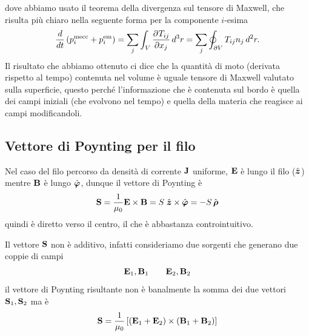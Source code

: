 dove abbiamo usato il teorema della divergenza sul tensore di Maxwell, che risulta più chiaro nella seguente forma per la componente $ i $-esima
\begin{align}
  \frac{d}{dt} \left( p_i^{\text{mecc}} + p_i^{\text{em}} \right) 
  = \sum_{j} \int_V \frac{\partial^{} {T_{i j}}}{\partial {x_j}^{}} \,d^3r = \sum_{j} \oint_{\partial V} T_{i j} n_j \,d^2r.
\end{align}
Il risultato che abbiamo ottenuto ci dice che la quantità di moto (derivata rispetto al tempo) contenuta nel volume è uguale tensore di Maxwell 
valutato sulla superficie, questo perché l'informazione che è contenuta sul bordo è quella dei campi iniziali (che evolvono nel tempo) e quella della 
materia che reagisce ai campi modificandoli.

\subsection{Vettore di Poynting per il filo}
Nel caso del filo percorso da densità di corrente $ \mathbf{ J } $ uniforme, $ \mathbf{ E } $ è lungo il filo ($ \hat{\boldsymbol{z}} $) mentre $ \mathbf{ B } $ è 
lungo $ \hat{\boldsymbol{\varphi}} $, dunque il vettore di Poynting è 
\begin{align}
  \mathbf{ S } = \frac{1}{\mu_0} \mathbf{ E } \times \mathbf{ B } = S\; \hat{\boldsymbol{z}} \times \hat{\boldsymbol{\varphi}} = - S \, \hat{\boldsymbol{\rho}}
\end{align}
quindi è diretto verso il centro, il che è abbastanza controintuitivo.

Il vettore $ \mathbf{ S } $ non è additivo, infatti consideriamo due sorgenti che generano due coppie di campi
\begin{align}
  \mathbf{ E }_1 , \mathbf{ B }_1 \qquad \mathbf{ E }_2 , \mathbf{ B }_2
\end{align}
il vettore di Poynting risultante non è banalmente la somma dei due vettori $ \mathbf{ S }_1, \mathbf{ S }_2 $ ma è
\begin{align}
  \mathbf{ S } = \frac{1}{\mu_0} \left[ (\mathbf{ E }_1 + \mathbf{ E }_2) \times (\mathbf{ B }_1 + \mathbf{ B }_2 ) \right]
\end{align}


